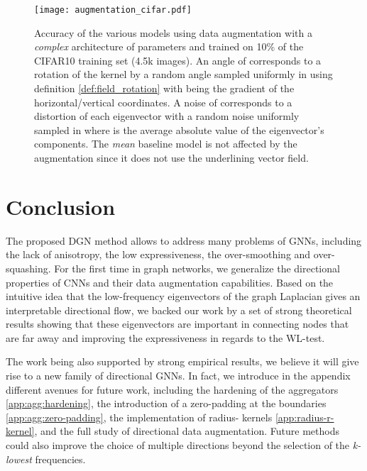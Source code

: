 \documentclass{article} \usepackage{arxiv,times}
\begin{document}
\begin{figure*}[h]
\centering
\texttt{[image: augmentation\_cifar.pdf]}
\vspace{-18pt}
\caption{ Accuracy of the various models using data augmentation with a \textit{complex} architecture of  parameters and trained on 10\% of the CIFAR10 training set (4.5k images). An angle of  corresponds to a rotation of the kernel by a random angle sampled uniformly in  using definition \ref{def:field_rotation} with  being the gradient of the horizontal/vertical coordinates. A noise of  corresponds to a distortion of each eigenvector with a random noise uniformly sampled in  where  is the average absolute value of the eigenvector's components. The \textit{mean} baseline model is not affected by the augmentation since it does not use the underlining vector field. }
\label{fig:results_augmentation}
\end{figure*}





\section{Conclusion}

The proposed DGN method allows to address many problems of GNNs, including the lack of anisotropy, the low expressiveness, the over-smoothing and over-squashing. For the first time in graph networks, we generalize the directional properties of CNNs and their data augmentation capabilities. Based on the intuitive idea that the low-frequency eigenvectors of the graph Laplacian gives an interpretable directional flow, we backed our work by a set of strong theoretical results showing that these eigenvectors are important in connecting nodes that are far away and improving the expressiveness in regards to the WL-test. 

The work being also supported by strong empirical results, we believe it will give rise to a new family of directional GNNs. In fact, we introduce in the appendix different avenues for future work, including the hardening of the aggregators \ref{app:agg:hardening}, the introduction of a zero-padding at the boundaries \ref{app:agg:zero-padding}, the implementation of radius- kernels \ref{app:radius-r-kernel}, and the full study of directional data augmentation. Future methods could also improve the choice of multiple directions beyond the selection of the \textit{k-lowest} frequencies.
\end{document}
